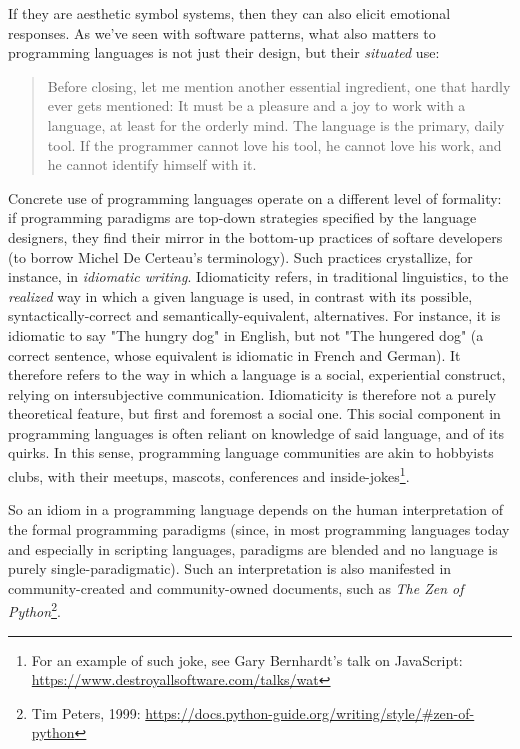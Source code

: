 \documentclass{article}
\begin{document}
If they are aesthetic symbol systems, then they can also elicit emotional responses. As we've seen with software patterns, what also matters to programming languages is not just their design, but their \emph{situated} use:

\begin{quote}
  Before closing, let me mention another essential ingredient, one that hardly ever gets mentioned: It must be a pleasure and a joy to work with a language, at least for the orderly mind. The language is the primary, daily tool. If the programmer cannot love his tool, he cannot love his work, and he cannot identify himself with it.\cite{wirth_essence_2003}
\end{quote}

Concrete use of programming languages operate on a different level of formality: if programming paradigms are top-down strategies specified by the language designers, they find their mirror in the bottom-up practices of softare developers (to borrow Michel De Certeau's terminology). Such practices crystallize, for instance, in \emph{idiomatic writing}. Idiomaticity refers, in traditional linguistics, to the \emph{realized} way in which a given language is used, in contrast with its possible, syntactically-correct and semantically-equivalent, alternatives. For instance, it is idiomatic to say "The hungry dog" in English, but not "The hungered dog" (a correct sentence, whose equivalent is idiomatic in French and German). It therefore refers to the way in which a language is a social, experiential construct, relying on intersubjective communication\cite{voloshinov_marxism_1986}. Idiomaticity is therefore not a purely theoretical feature, but first and foremost a social one. This social component in programming languages is often reliant on knowledge of said language, and of its quirks. In this sense, programming language communities are akin to hobbyists clubs, with their meetups, mascots, conferences and inside-jokes\footnote{For an example of such joke, see Gary Bernhardt's talk on JavaScript: \url{https://www.destroyallsoftware.com/talks/wat}}.

So an idiom in a programming language depends on the human interpretation of the formal programming paradigms (since, in most programming languages today and especially in scripting languages, paradigms are blended and no language is purely single-paradigmatic). Such an interpretation is also manifested in community-created and community-owned documents, such as \emph{The Zen of Python}\footnote{Tim Peters, 1999: \url{https://docs.python-guide.org/writing/style/#zen-of-python}}.
\end{document}
